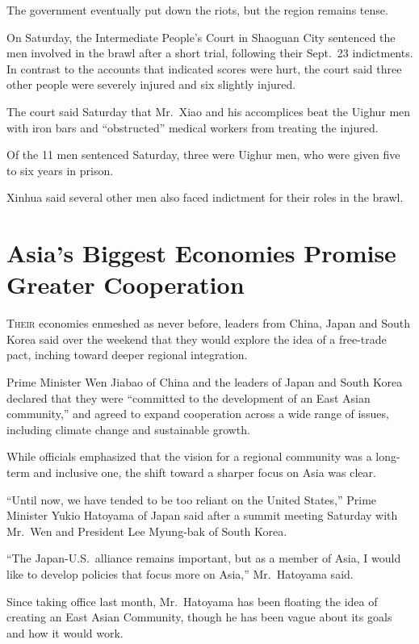 ﻿\documentclass[12pt]{article}
\begin{document}
The government eventually put down the riots, but the region remains tense.

On Saturday, the Intermediate People's Court in Shaoguan City sentenced the men involved in the
brawl after a short trial, following their Sept.~23 indictments. In contrast to the accounts that
indicated scores were hurt, the court said three other people were severely injured and six slightly
injured.

The court said Saturday that Mr.~Xiao and his accomplices beat the Uighur men with iron bars and
``obstructed'' medical workers from treating the injured.

Of the 11 men sentenced Saturday, three were Uighur men, who were given five to six years in prison.

Xinhua said several other men also faced indictment for their roles in the brawl.

\section{Asia's Biggest Economies Promise Greater Cooperation}

\lettrine{T}{heir} economies enmeshed as never before, leaders from China,
Japan and South Korea said over the weekend that they would explore the idea of a free-trade pact,
inching toward deeper regional integration.

Prime Minister Wen Jiabao of China and the leaders of Japan and South Korea declared that they were
``committed to the development of an East Asian community,'' and agreed to expand cooperation across
a wide range of issues, including climate change and sustainable growth.

While officials emphasized that the vision for a regional community was a long-term and inclusive
one, the shift toward a sharper focus on Asia was clear.

``Until now, we have tended to be too reliant on the United States,'' Prime Minister Yukio Hatoyama
of Japan said after a summit meeting Saturday with Mr.~Wen and President Lee Myung-bak of South
Korea.

``The Japan-U.S.~alliance remains important, but as a member of Asia, I would like to develop
policies that focus more on Asia,'' Mr.~Hatoyama said.

Since taking office last month, Mr.~Hatoyama has been floating the idea of creating an East Asian
Community, though he has been vague\cite{vague} about its goals and how it would work.
\end{document}
